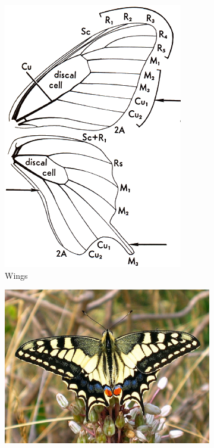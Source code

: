 \documentclass[letterpaper, 11pt]{article}
\begin{document}
\begin{figure}[ht!]
    \centering
    \begin{subfigure}[ht!]{0.28\textwidth}
        \includegraphics[width=\textwidth]{image26}
        \caption{Wings}
        \label{fig:papilionid1}
    \end{subfigure}
    \qquad %
    \begin{subfigure}[ht!]{0.5\textwidth}
        \includegraphics[width=\textwidth]{image27}

\end{subfigure}
\end{figure}
\end{document}
